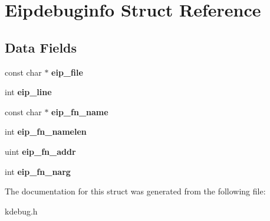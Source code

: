 \hypertarget{structEipdebuginfo}{}\section{Eipdebuginfo Struct Reference}
\label{structEipdebuginfo}
\subsection*{Data Fields}
\begin{DoxyCompactItemize}
\item 
\mbox{\label{structEipdebuginfo_a99b3b41ad2ea9528df161222af62321a}} 
const char $\ast$ {\bfseries eip\+\_\+file}
\item 
\mbox{\label{structEipdebuginfo_a50c332e0b0310474b13924a4f6e9fdf4}} 
int {\bfseries eip\+\_\+line}
\item 
\mbox{\label{structEipdebuginfo_a5e8cc118e7d6fd43dfaf6126cb2a4fe0}} 
const char $\ast$ {\bfseries eip\+\_\+fn\+\_\+name}
\item 
\mbox{\label{structEipdebuginfo_afacac024e9d624f641169c9bb095b2b6}} 
int {\bfseries eip\+\_\+fn\+\_\+namelen}
\item 
\mbox{\label{structEipdebuginfo_a862fd972f792c828e2f2519e57c7f011}} 
uint {\bfseries eip\+\_\+fn\+\_\+addr}
\item 
\mbox{\label{structEipdebuginfo_a78772b4f4ca1428fe983cd7778324504}} 
int {\bfseries eip\+\_\+fn\+\_\+narg}
\end{DoxyCompactItemize}


The documentation for this struct was generated from the following file\+:\begin{DoxyCompactItemize}
\item 
kdebug.\+h\end{DoxyCompactItemize}
